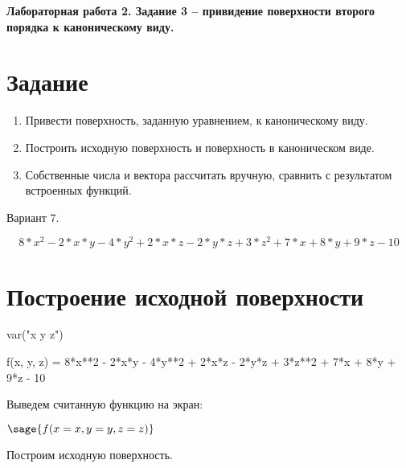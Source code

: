 \documentclass{article}
\begin{document}
	
	\begin{center}
		\Large{\textbf{Лабораторная работа 2. Задание 3 -- привидение поверхности второго порядка к каноническому виду.}}
	\end{center}
	
	
	\section{Задание}
	\begin{enumerate}
		\item Привести поверхность, заданную уравнением, к каноническому виду.
		\item Построить исходную поверхность и поверхность в каноническом виде.
		\item Собственные числа и вектора рассчитать вручную, сравнить с результатом встроенных функций.
	\end{enumerate}
	
	\begin{center}
		Вариант 7.
	\end{center}
	$$ 8*x^2 - 2*x*y - 4*y^2 + 2*x*z - 2*y*z + 3*z^2 + 7*x + 8*y + 9*z - 10 $$
	
	\section{Построение исходной поверхности}
	
	\begin{sagesilent}
		var("x y z")
	\end{sagesilent}
	
	\begin{sageblock}
		f(x, y, z) =  8*x**2 - 2*x*y - 4*y**2 + 2*x*z - 2*y*z + 3*z**2 + 7*x + 8*y + 9*z - 10
	\end{sageblock}
	
	Выведем считанную функцию на экран:
	
	\begin{center}
		$\sage{f(x=x, y=y, z=z)}$
	\end{center}
	
	Построим исходную поверхность.
	
	\begin{center}
	\end{center}
	
	
\end{document}
